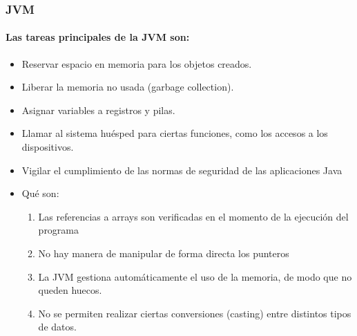 \documentclass{beamer}
\begin{document}

\begin{frame}
\frametitle{JVM}
\framesubtitle{Las tareas principales de la JVM son:}
\begin{itemize}[<+->]
\item Reservar espacio en memoria para los objetos creados.
\item Liberar la memoria no usada (garbage collection).
\item Asignar variables a registros y pilas.
\item Llamar al sistema huésped para ciertas funciones, como los accesos a los dispositivos.
\item Vigilar el cumplimiento de las normas de seguridad de las aplicaciones Java
\item Qué son:
\begin{enumerate}
\item Las referencias a arrays son verificadas en el momento de la ejecución del programa
\item No hay manera de manipular de forma directa los punteros
\item La JVM gestiona automáticamente el uso de la memoria, de modo que no queden huecos.
\item No se permiten realizar ciertas conversiones (casting) entre distintos tipos de datos.

\end{enumerate}
\end{itemize}
\end{frame}
\end{document}
